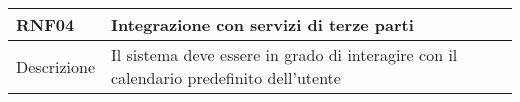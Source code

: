 \begin{table}[H]
  \begin{flushleft}
    \begin{tabular}{l|l}
      \toprule
      \textbf{RNF04} & \textbf{Integrazione con servizi di terze parti}\\
      \midrule
      Descrizione & Il sistema deve essere in grado di interagire con il calendario predefinito dell'utente\\
      \bottomrule
    \end{tabular}
  \end{flushleft}
\end{table}
